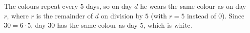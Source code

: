 The colours repeat every $5$ days, so on day $d$ he wears the same colour as on day $r$, where $r$ is the remainder of $d$ on division by $5$ (with $r=5$ instead of $0$). Since $30=6\cdot5$, day $30$ has the same colour as day $5$, which is $\boxed{\text{white}}$.

